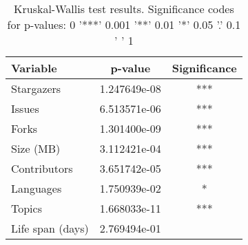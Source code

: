 \begin{table}[h!]
\centering
\begin{tabular}{lcc}
\toprule
        Variable &      p-value & Significance \\
\midrule
      Stargazers & 1.247649e-08 &          *** \\
          Issues & 6.513571e-06 &          *** \\
           Forks & 1.301400e-09 &          *** \\
       Size (MB) & 3.112421e-04 &          *** \\
    Contributors & 3.651742e-05 &          *** \\
       Languages & 1.750939e-02 &            * \\
          Topics & 1.668033e-11 &          *** \\
Life span (days) & 2.769494e-01 &              \\
\bottomrule
\end{tabular}
\caption{Kruskal-Wallis test results. Significance codes for p-values:  0 '***' 0.001 '**' 0.01 '*' 0.05 '.' 0.1 ' ' 1}
\label{tab:kruskal_wallis}
\end{table}
